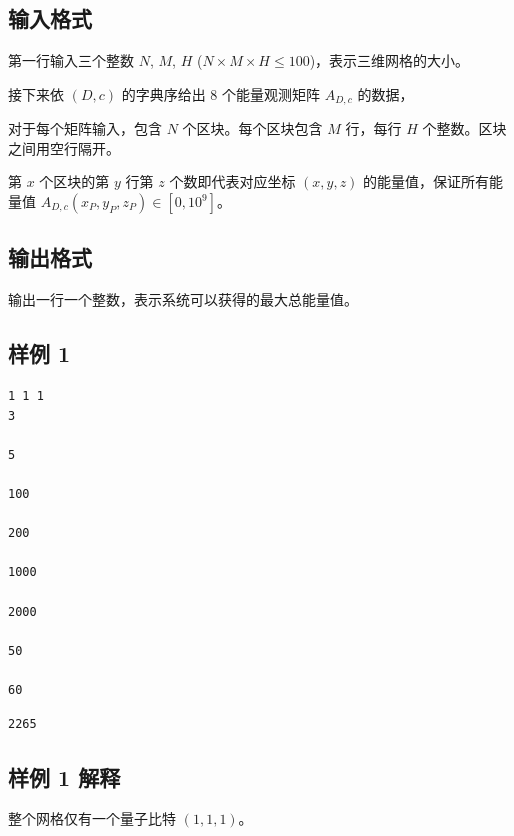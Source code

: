 \subsection{输入格式}

第一行输入三个整数 $N$, $M$, $H$ ($N \times M \times H \le 100$)，表示三维网格的大小。

接下来依 $(D,c)$ 的字典序给出 8 个能量观测矩阵 $A_{D,c}$ 的数据，

对于每个矩阵输入，包含 $N$ 个区块。每个区块包含 $M$ 行，每行 $H$ 个整数。区块之间用空行隔开。

第 $x$ 个区块的第 $y$ 行第 $z$ 个数即代表对应坐标 $(x, y, z)$ 的能量值，保证所有能量值 $A_{D, c}(x_P, y_P, z_P) \in [0, 10^9]$。

\subsection{输出格式}

输出一行一个整数，表示系统可以获得的最大总能量值。

\subsection{样例 1}

\begin{minipage}{\linewidth}
	\begin{minipage}[t]{0.49\linewidth}
		\begin{lstlisting}[title=\texttt{standard input}]
1 1 1
3

5

100

200

1000

2000

50

60
\end{lstlisting}
	\end{minipage}
	\begin{minipage}[t]{0.49\linewidth}
		\begin{lstlisting}[title=\texttt{standard output}]
2265
\end{lstlisting}
	\end{minipage}
\end{minipage}


\subsection{样例 1 解释}

整个网格仅有一个量子比特 $(1, 1, 1)$。

